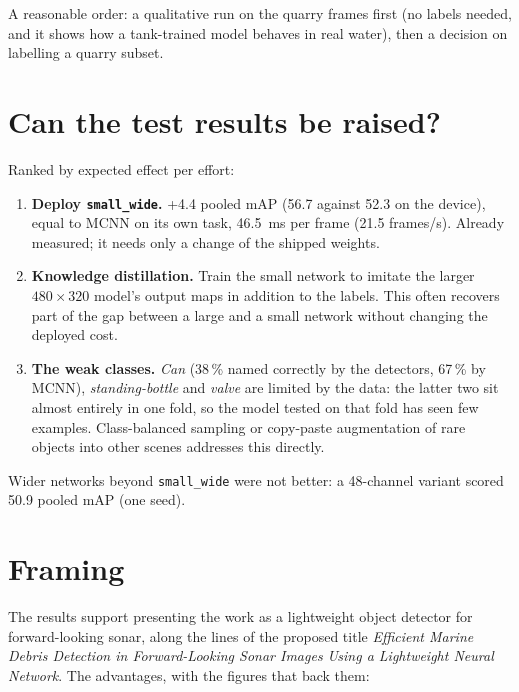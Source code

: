 \documentclass[11pt,a4paper]{article}
\newcommand{\cfg}[1]{\texttt{#1}}
\begin{document}
A reasonable order: a qualitative run on the quarry frames first (no labels
needed, and it shows how a tank-trained model behaves in real water), then
a decision on labelling a quarry subset.

\section{Can the test results be raised?}
\label{sec:improve}

Ranked by expected effect per effort:

\begin{enumerate}
  \item \textbf{Deploy \cfg{small\_wide}.} +4.4 pooled mAP (56.7 against
        52.3 on the device), equal to MCNN on its own task, 46.5~ms per frame
        (21.5 frames/s). Already measured; it needs only a change of the
        shipped weights.
  \item \textbf{Knowledge distillation.} Train the small network to imitate
        the larger $480 \times 320$ model's output maps in addition to the
        labels. This often recovers part of the gap between a large and a
        small network without changing the deployed cost.
  \item \textbf{The weak classes.} \emph{Can} (38\,\% named correctly by the
        detectors, 67\,\% by MCNN), \emph{standing-bottle} and \emph{valve}
        are limited by the data: the latter two sit almost entirely in one
        fold, so the model tested on that fold has seen few examples.
        Class-balanced sampling or copy-paste augmentation of rare objects
        into other scenes addresses this directly.
\end{enumerate}

Wider networks beyond \cfg{small\_wide} were not better: a 48-channel
variant scored 50.9 pooled mAP (one seed).

\section{Framing}
\label{sec:framing}

The results support presenting the work as a lightweight object detector
for forward-looking sonar, along the lines of the proposed title
\emph{Efficient Marine Debris Detection in Forward-Looking Sonar Images
Using a Lightweight Neural Network}. The advantages, with the figures that
back them:
\end{document}
